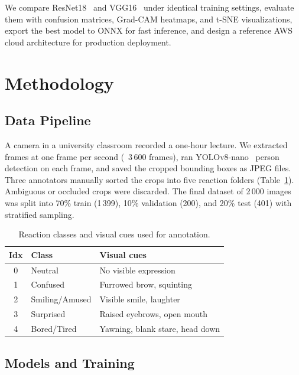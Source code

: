 \documentclass[conference]{IEEEtran}
\begin{document}
We compare ResNet18~\cite{he2016deep} and VGG16~\cite{simonyan2015very} under identical training settings, evaluate them with confusion matrices, Grad-CAM heatmaps, and t-SNE visualizations, export the best model to ONNX for fast inference, and design a reference AWS cloud architecture for production deployment.

\section{Methodology}

\subsection{Data Pipeline}

A camera in a university classroom recorded a one-hour lecture. We extracted frames at one frame per second (~3\,600 frames), ran YOLOv8-nano~\cite{jocher2023yolo} person detection on each frame, and saved the cropped bounding boxes as JPEG files. Three annotators manually sorted the crops into five reaction folders (Table~\ref{tab:classes}). Ambiguous or occluded crops were discarded. The final dataset of 2\,000 images was split into 70\% train (1\,399), 10\% validation (200), and 20\% test (401) with stratified sampling.

\begin{table}[H]
\centering
\caption{Reaction classes and visual cues used for annotation.}
\label{tab:classes}
\begin{tabular}{@{}clp{4.8cm}@{}}
\toprule
\textbf{Idx} & \textbf{Class} & \textbf{Visual cues} \\
\midrule
0 & Neutral          & No visible expression \\
1 & Confused         & Furrowed brow, squinting \\
2 & Smiling/Amused   & Visible smile, laughter \\
3 & Surprised        & Raised eyebrows, open mouth \\
4 & Bored/Tired      & Yawning, blank stare, head down \\
\bottomrule
\end{tabular}
\end{table}

\subsection{Models and Training}
\end{document}
